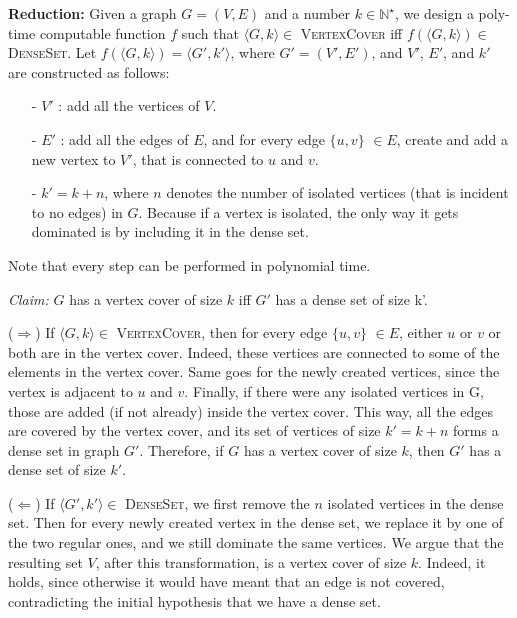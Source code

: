 \documentclass{article}
\begin{document}
\noindent\textbf{Reduction:} Given a graph $G=(V,E)$ and a number $k \in \mathbb{N}^\star$, we design a poly-time computable function $f$ such that $\langle G, k\rangle\in$ \textsc{VertexCover} iff $f(\langle G, k\rangle)\in$ \textsc{DenseSet}. Let $f(\langle G, k\rangle)=\langle G', k'\rangle$, where $G'=(V', E')$, and $V'$, $E'$, and $k'$ are constructed as follows:

\begin{enumerate}[noitemsep, topsep=0pt]
    \item [-] $V'$ : add all the vertices of $V$.
    \item [-] $E'$ : add all the edges of $E$, and for every edge $\{u, v\}$ $\in E$, create and add a new vertex to $V'$, that is connected to $u$ and $v$.
    \item [-] $k'=k+n$, where $n$ denotes the number of isolated vertices (that is incident to no edges) in $G$. Because if a vertex is isolated, the only way it gets dominated is by including it in the dense set.
\end{enumerate}

\noindent Note that every step can be performed in polynomial time.

\medskip\noindent\textit{Claim:} $G$ has a vertex cover of size $k$ iff $G'$ has a dense set of size k'.

\medskip\noindent ($\Rightarrow$) If $\langle G, k\rangle\in$ \textsc{VertexCover}, then for every edge $\{u, v\}$ $\in E$, either $u$ or $v$ or both are in the vertex cover. Indeed, these vertices are connected to some of the elements in the vertex cover. Same goes for the newly created vertices, since the vertex is adjacent to $u$ and $v$. Finally, if there were any isolated vertices in G, those are added (if not already) inside the vertex cover. This way, all the edges are covered by the vertex cover, and its set of vertices of size $k'=k+n$ forms a dense set in graph $G'$.
Therefore, if $G$ has a vertex cover of size $k$, then $G'$ has a dense set of size $k'$.

\medskip\noindent ($\Leftarrow$) If $\langle G', k'\rangle\in$ \textsc{DenseSet}, we first remove the $n$ isolated vertices in the dense set. Then for every newly created vertex in the dense set, we replace it by one of the two regular ones, and we still dominate the same vertices. We argue that the resulting set $V$, after this transformation, is a vertex cover of size $k$. Indeed, it holds, since otherwise it would have meant that an edge is not covered, contradicting the initial hypothesis that we have a dense set.
\end{document}
